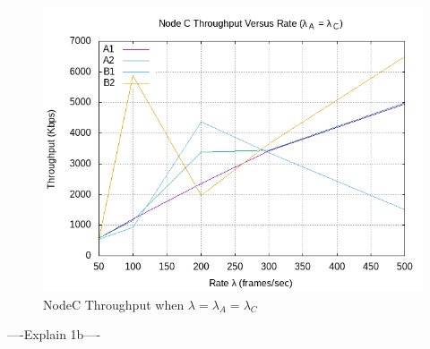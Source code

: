 \documentclass[12pt]{article}
\begin{document}
\begin{enumerate}
{            \begin{figure}[!htb]
                \centering
                \includegraphics[width=5in]{1B.png}
                \caption{NodeC Throughput when \(\lambda{} = \lambda{}_A = \lambda{}_C\) }
                \label{fig:1B}
            \end{figure}

            ----Explain 1b----
        }
        
        
        
        
        
    \end{enumerate}
\end{document}
